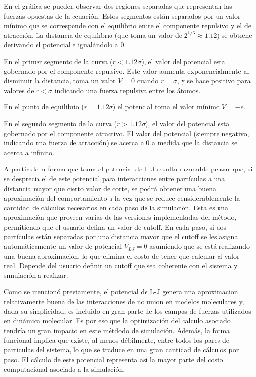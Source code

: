 \documentclass[a4paper,10pt]{report}
\begin{document}
En el gráfica se pueden observar dos regiones separadas que representan las fuerzas opuestas de la ecuación. 
Estos segmentos están separados por un valor mínimo que se corresponde con el equilibrio entre el componente repulsivo y el de atracción. 
La distancia de equilibrio (que toma un valor de $2^{1/6}\approx1.12$) se obtiene derivando el potencial e igualándolo a 0.

En el primer segmento de la curva ($r<1.12\sigma$), el valor del potencial esta gobernado por el componente repulsivo. 
Este valor aumenta exponencialmente al disminuir la distancia, toma un valor $V=0$ cuando $r=\sigma$, y se hace positivo para valores de $r<\sigma$ indicando una fuerza repulsiva entre los átomos.

En el punto de equilibrio ($r=1.12\sigma$) el potencial toma el valor mínimo $V=-\epsilon$.

En el segundo segmento de la curva ($r>1.12\sigma$), el valor del potencial esta gobernado por el componente atractivo. El valor del potencial (siempre negativo, indicando una fuerza de atracción) se acerca a 0 a medida que la distancia se acerca a infinito. 


A partir de la forma que toma el potencial de L-J resulta razonable pensar que, si se desprecia el de este potencial para interacciones entre partículas a una distancia mayor que cierto valor de corte, se podrá obtener una buena aproximación del comportamiento a la vez que se reduce considerablemente la cantidad de cálculos necesarios en cada paso de la simulación.
Esta es una aproximación que proveen varias de las versiones implementadas del método, permitiendo que el usuario defina un valor de cutoff. 
En cada paso, si dos partículas están separadas por una distancia mayor que el cutoff se les asigna automáticamente un valor de potencial $V_{LJ}=0$ asumiendo que se está realizando una buena aproximación, lo que elimina el costo de tener que calcular el valor real. 
Depende del usuario definir un cutoff que sea coherente con el sistema y simulación a realizar.

Como se mencionó previamente, el potencial de L-J genera una aproximacion relativamente buena de las interacciones de no union en modelos moleculares y, dada su simplicidad, es incluido en gran parte de los campos de fuerzas utilizados en dinámica molecular.
Es por eso que la optimización del calculo asociado tendría un gran impacto en este métdodo de simulación. Además, la forma funcional implica que existe, al menos débilmente, entre todos los pares de particulas del sistema, lo que se traduce en una gran cantidad de cálculos por paso. 
El cálculo de este potencial representa así la mayor parte del costo computacional asociado a la simulación. 
\end{document}
